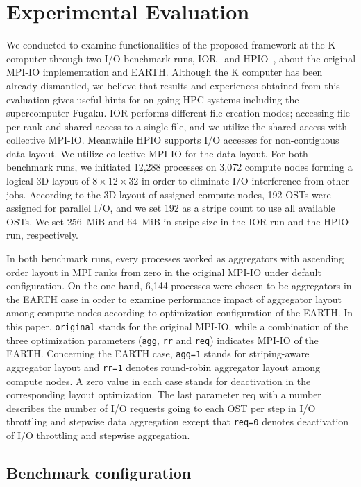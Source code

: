 \documentclass{jhps}
\begin{document}
\section{Experimental Evaluation}
\label{sec:EVAL}

We conducted to examine functionalities of the proposed framework
at the K computer through two I/O benchmark runs,
IOR~\cite{IOR:web} and HPIO~\cite{ching:ipdps06},
about the original MPI-IO implementation and EARTH.
Although the K computer has been already dismantled,
we believe that results and experiences obtained from this evaluation
gives useful hints for on-going HPC systems including the supercomputer Fugaku.
IOR performs different file creation modes; accessing
file per rank and shared access to a single file, and we utilize
the shared access with collective MPI-IO.
Meanwhile HPIO supports I/O accesses for non-contiguous data layout.
We utilize collective MPI-IO for the data layout.
For both benchmark runs, we initiated 12,288 processes on 3,072 compute nodes
forming a logical 3D layout of $8\times12\times32$ in order to eliminate I/O interference
from other jobs. According to the 3D layout of assigned compute nodes,
192 OSTs were assigned for parallel I/O, and we set 192 as a stripe count
to use all available OSTs.
We set 256~MiB and 64~MiB in stripe size in the IOR run and the HPIO run, respectively.

In both benchmark runs, every processes worked as aggregators
with ascending order layout in MPI ranks from zero in the original MPI-IO
under default configuration.
On the one hand, 6,144 processes were chosen to be aggregators in the EARTH case
in order to examine performance impact of aggregator layout among compute nodes
according to optimization configuration of the EARTH.
In this paper, {\tt original} stands for the original MPI-IO,
while a combination of the three optimization parameters
({\tt agg}, {\tt rr} and {\tt req}) indicates MPI-IO of the EARTH.
Concerning the EARTH case, {\tt agg=1} stands for striping-aware aggregator layout
and {\tt rr=1} denotes round-robin aggregator layout among compute nodes.
A zero value in each case stands for deactivation in the corresponding layout optimization.
The last parameter req with a number describes the number of I/O requests
going to each OST per step in I/O throttling and stepwise data aggregation
except that {\tt req=0} denotes deactivation of I/O throttling and stepwise aggregation.

\subsection{Benchmark configuration}
\end{document}
